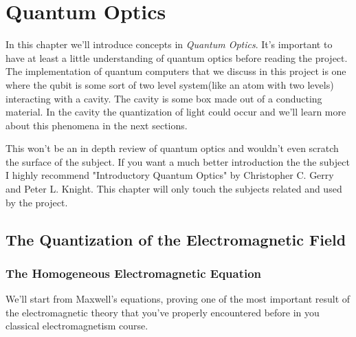 \documentclass[english, a4paper, 12pt, twoside]{article}
\numberwithin{equation}{section} %
\begin{document}
\newpage
\section{Quantum Optics}
In this chapter we'll introduce concepts in \textit{Quantum Optics}. It's important to have at least a little understanding of quantum optics before reading the project. The implementation of quantum computers that we discuss in this project is one where the qubit is some sort of two level system(like an atom with two levels) interacting with a cavity. The cavity is some box made out of a conducting material. In the cavity the quantization of light could occur and we'll learn more about this phenomena in the next sections.

This won't be an in depth review of quantum optics and wouldn't even scratch the surface of the subject. If you want a much better introduction the the subject I highly recommend "Introductory Quantum Optics" by Christopher C. Gerry and Peter L. Knight. This chapter will only touch the subjects related and used by the project.

\subsection{The Quantization of the Electromagnetic Field}
\subsubsection{The Homogeneous Electromagnetic Equation}
We'll start from Maxwell's equations, proving one of the most important result of the electromagnetic theory that you've properly encountered before in you classical electromagnetism course.
\end{document}
